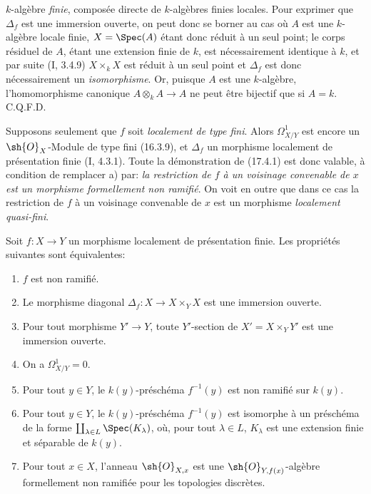 $k$-algèbre \emph{finie}, composée directe de $k$-algèbres finies locales. Pour exprimer que $\Delta_f$ est une immersion ouverte, on peut donc se borner au cas où $A$ est une $k$-algèbre locale finie, $X=\Spec(A)$ étant donc réduit à un seul point; le corps résiduel de $A$, étant une extension finie de $k$, est nécessairement identique à $k$, et par suite (I, 3.4.9) $X\times_k X$ est réduit à un seul point et $\Delta_f$ est donc nécessairement un \emph{isomorphisme}. Or, puisque $A$ est une $k$-algèbre, l'homomorphisme canonique $A\otimes_k A\to A$ ne peut être bijectif que si $A=k$. C.Q.F.D.

\begin{remark}[17.4.1.2]
\label{IV.17.4.1.2}
Supposons seulement que $f$ soit \emph{localement de type fini}. Alors $\Omega^1_{X/Y}$ est encore un $\sh{O}_X$-Module de type fini (16.3.9), et $\Delta_f$ un morphisme localement de présentation finie (I, 4.3.1). Toute la démonstration de (17.4.1) est donc valable, à condition de remplacer a) par: \emph{la restriction de $f$ à un voisinage convenable de $x$ est un morphisme formellement non ramifié}. On voit en outre que dans ce cas la restriction de $f$ à un voisinage convenable de $x$ est un morphisme \emph{localement quasi-fini}.
\end{remark}

\begin{corollary}[17.4.2]
\label{IV.17.4.2}
Soit $f:X\to Y$ un morphisme localement de présentation finie. Les propriétés suivantes sont équivalentes:
\begin{enumerate}
  \item[a)] $f$ est non ramifié.
  \item[b)] Le morphisme diagonal $\Delta_f:X\to X\times_Y X$ est une immersion ouverte.
  \item[b')] Pour tout morphisme $Y'\to Y$, toute $Y'$-section de $X'=X\times_Y Y'$ est une immersion ouverte.
  \item[c)] On a $\Omega^1_{X/Y}=0$.
  \item[d)] Pour tout $y\in Y$, le $k(y)$-préschéma $f^{-1}(y)$ est non ramifié sur $k(y)$.
  \item[d')] Pour tout $y\in Y$, le $k(y)$-préschéma $f^{-1}(y)$ est isomorphe à un préschéma de la forme $\coprod_{\lambda\in L}\Spec(K_\lambda)$, où, pour tout $\lambda\in L$, $K_\lambda$ est une extension finie et séparable de $k(y)$.
  \item[e)] Pour tout $x\in X$, l'anneau $\sh{O}_{X,x}$ est une $\sh{O}_{Y,f(x)}$-algèbre formellement non ramifiée pour les topologies discrètes.
\end{enumerate}
\end{corollary}


